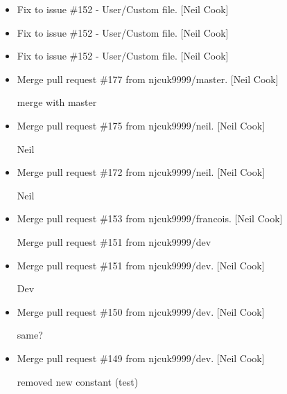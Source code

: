 \documentclass[a4paper,10pt,english]{report}
\begin{document}
\begin{itemize}
\item {} 
Fix to issue \#152 - User/Custom  file. {[}Neil Cook{]}

\item {} 
Fix to issue \#152 - User/Custom  file. {[}Neil Cook{]}

\item {} 
Fix to issue \#152 - User/Custom  file. {[}Neil Cook{]}

\item {} 
Merge pull request \#177 from njcuk9999/master. {[}Neil Cook{]}

merge with master

\item {} 
Merge pull request \#175 from njcuk9999/neil. {[}Neil Cook{]}

Neil

\item {} 
Merge pull request \#172 from njcuk9999/neil. {[}Neil Cook{]}

Neil

\item {} 
Merge pull request \#153 from njcuk9999/francois. {[}Neil Cook{]}

Merge pull request \#151 from njcuk9999/dev

\item {} 
Merge pull request \#151 from njcuk9999/dev. {[}Neil Cook{]}

Dev

\item {} 
Merge pull request \#150 from njcuk9999/dev. {[}Neil Cook{]}

same?

\item {} 
Merge pull request \#149 from njcuk9999/dev. {[}Neil Cook{]}

removed new constant (test)

\end{itemize}
\end{document}
